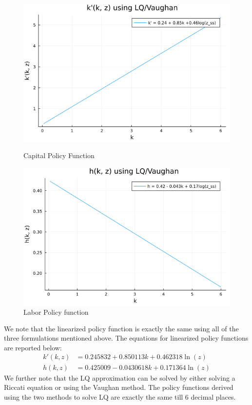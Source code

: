 \documentclass[12pt]{article}
\begin{document}
\begin{figure}[h]
    \centering
    \begin{minipage}{0.45\textwidth}
        \centering
        \includegraphics[width=1.2\textwidth]{cap_policy_VLQ.png} %
        \caption{Capital Policy Function}
    \end{minipage}\hfill
    \begin{minipage}{0.45\textwidth}
        \centering
        \includegraphics[width=1.2\textwidth]{h_policy_VLQ.png} %
        \caption{Labor Policy function}
    \end{minipage}
\end{figure}

We note that the linearized policy function is exactly the same using all of the three formulations mentioned above. The equations for linearized policy functions are reported below:\\
\begin{align*}
k'(k, z) & =  0.245832  +0.850113k   +0.462318 \ln(z)\\
h(k, z) & = 0.425009  - 0.0430618k  +0.171364\ln(z)
\end{align*}
We further note that the LQ approximation can be solved by either solving a Riccati equation or using the Vaughan method. The policy functions derived using the two methods to solve LQ are exactly the same till 6 decimal places.
\end{document}
